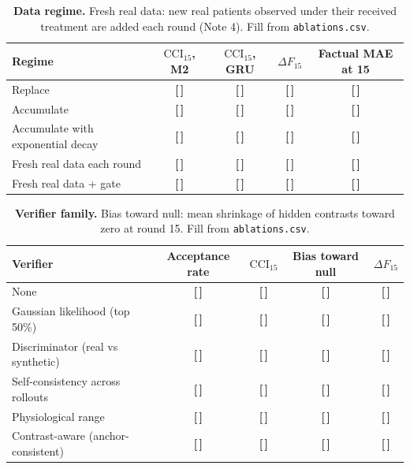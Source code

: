 \documentclass[11pt,a4paper]{article}
\newcommand{\T}{{\color{red}\textbf{[\,]}}}
\newcommand{\CCI}{\mathrm{CCI}}
\begin{document}
\FloatBarrier
\begin{table}[!htbp]\centering\footnotesize
\caption{\textbf{Data regime.} Fresh real data: new real patients observed under their received treatment are added each round (Note 4). Fill from \texttt{ablations.csv}.}
\begin{tabularx}{\textwidth}{@{}p{3.9cm} C C C C@{}}\toprule
Regime & $\CCI_{15}$, M2 & $\CCI_{15}$, GRU & $\Delta F_{15}$ & Factual MAE at 15\\\midrule
Replace & \T & \T & \T & \T\\
Accumulate & \T & \T & \T & \T\\
Accumulate with exponential decay & \T & \T & \T & \T\\
Fresh real data each round & \T & \T & \T & \T\\
Fresh real data + gate & \T & \T & \T & \T\\
\bottomrule\end{tabularx}
\end{table}
\FloatBarrier
\begin{table}[!htbp]\centering\footnotesize
\caption{\textbf{Verifier family.} Bias toward null: mean shrinkage of hidden contrasts toward zero at round 15. Fill from \texttt{ablations.csv}.}
\begin{tabularx}{\textwidth}{@{}p{3.9cm} C C C C@{}}\toprule
Verifier & Acceptance rate & $\CCI_{15}$ & Bias toward null & $\Delta F_{15}$\\\midrule
None & \T & \T & \T & \T\\
Gaussian likelihood (top 50\%) & \T & \T & \T & \T\\
Discriminator (real vs synthetic) & \T & \T & \T & \T\\
Self-consistency across rollouts & \T & \T & \T & \T\\
Physiological range & \T & \T & \T & \T\\
Contrast-aware (anchor-consistent) & \T & \T & \T & \T\\
\bottomrule\end{tabularx}
\end{table}
\FloatBarrier
\end{document}
